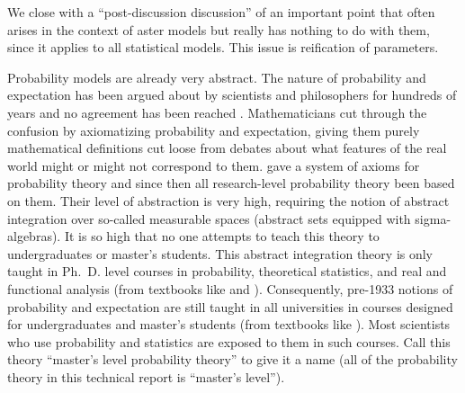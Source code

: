 \documentclass[11pt]{article}
\begin{document}
We close with a ``post-discussion discussion'' of an important point that often
arises in the context of aster models but really has nothing to do with them,
since it applies to all statistical models.  This issue is reification
of parameters.

Probability models are already very abstract.  The nature of probability
and expectation has been argued about by scientists and philosophers for
hundreds of years and no agreement has been reached \citep{hajek}.
Mathematicians cut
through the confusion by axiomatizing probability and expectation, giving
them purely mathematical definitions cut loose from debates about what features
of the real world might or might not correspond to them.
\citet{kolmogorov-foundations} gave a system of axioms for probability theory
and since then all research-level probability theory been based on them.
Their level of abstraction is very high, requiring the notion of abstract
integration over so-called measurable spaces (abstract sets equipped with
sigma-algebras).  It is so high that no one attempts to teach this theory
to undergraduates or master's students.  This abstract integration theory
is only taught in Ph.~D. level courses in probability, theoretical statistics,
and real and functional analysis (from textbooks like \citealp{fristedt-gray}
and \citealp{rudin}).  Consequently, pre-1933 notions of
probability and expectation are still taught in all universities in courses
designed for undergraduates and master's students
(from textbooks like \citealp{casella-berger}).  Most scientists who use
probability and statistics are exposed to them in such courses.
Call this theory ``master's level probability theory'' to give it a name
(all of the probability theory in this technical report is ``master's level'').
\end{document}
